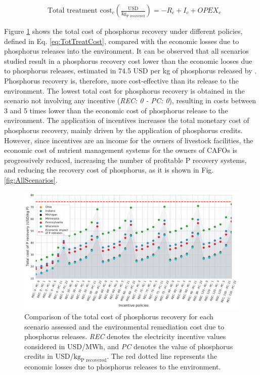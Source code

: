 \begin{refsection}[referencesCh5]
\begin{align}
& \text{Total treatment cost}_{c} \left(\frac{\text{USD}}{\text{kg}_{\text{P recovered}}}\right) = -R_{c} + I_{c} + OPEX_{c} \label{eq:TotTreatCost}
\end{align}

Figure \ref{fig:plot_scenarios} shows the total cost of phosphorus recovery under different policies, defined in Eq. \ref{eq:TotTreatCost}, compared with the economic losses due to phosphorus releases into the environment. It can be observed that all scenarios studied result in a phosphorus recovery cost lower than the economic looses due to phosphorus releases, estimated in 74.5 USD per kg of phosphorus released by \citet{Sampat2020}. Phosphorus recovery is, therefore, more cost-effective than its release to the environment. The lowest total cost for phosphorus recovery is obtained in the scenario not involving any incentive (\textit{REC: 0 - PC: 0}), resulting in costs between 3 and 5 times lower than the economic cost of phosphorus release to the environment. The application of incentives increases the total monetary cost of phosphorus recovery, mainly driven by the application of phosphorus credits. However, since incentives are an income for the owners of livestock facilities, the economic cost of nutrient management systems for the owners of CAFOs is progressively reduced, increasing the number of profitable P recovery systems, and reducing the recovery cost of phosphorus, as it is shown in Fig. \ref{fig:AllScenarios}.

\begin{figure}[h!]
	\centering
	\includegraphics[width=\linewidth]{gfx/Chapter5/TotalCost_kgPRecoveredAllStatesv2.pdf} 
	
	\caption{Comparison of the total cost of phosphorus recovery for each scenario assessed and the environmental remediation cost due to phosphorus releases. \textit{REC} denotes the electricity incentive values considered in USD/MWh, and \textit{PC} denotes the value of phosphorus credits in USD/${\text{kg}_\text{P recovered}}$. The red dotted line represents the economic losses due to phosphorus releases to the environment.}
	\label{fig:plot_scenarios}
\end{figure}


\end{refsection}
